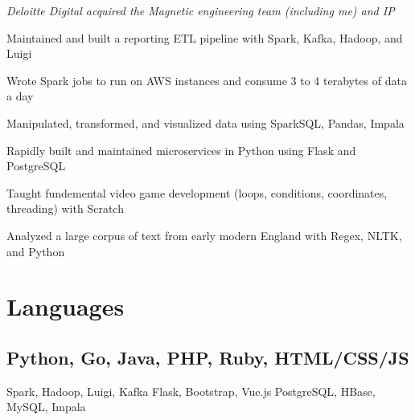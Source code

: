 \documentclass[]{deedy-resume-openfont}
\begin{document}
\vspace{\topsep} %
\textit{Deloitte Digital acquired the Magnetic engineering team (including me) and IP}
\begin{tightemize}
\item Maintained and built a reporting ETL pipeline with Spark, Kafka, Hadoop, and Luigi
\item Wrote Spark jobs to run on AWS instances and consume 3 to 4 terabytes of data a day
\item Manipulated, transformed, and visualized data using SparkSQL, Pandas, Impala
\item Rapidly built and maintained microservices in Python using Flask and PostgreSQL
\end{tightemize}
\sectionsep

\vspace{\topsep} %
\begin{tightemize}
\item Taught fundemental video game development (loops, conditions, coordinates, threading) with Scratch
\end{tightemize}
\sectionsep

\vspace{\topsep} %
\begin{tightemize}
\item Analyzed a large corpus of text from early modern England with Regex, NLTK, and Python
\end{tightemize}
\sectionsep


\section{Languages}
\vspace{\topsep} %
\subsection{Python, Go, Java, PHP, Ruby, HTML/CSS/JS}
Spark, Hadoop, Luigi, Kafka \textbullet{} Flask, Bootstrap, Vue.js \textbullet{} PostgreSQL, HBase, MySQL, Impala
\sectionsep
\end{document}
